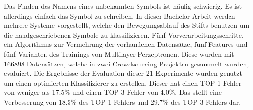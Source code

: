 \documentclass[a4paper,oneside]{scrartcl}
\begin{document}
Das Finden des Namens eines unbekannten Symbols ist häufig schwierig. Es ist
allerdings einfach das Symbol zu schreiben. In dieser Bachelor-Arbeit werden
mehrere Systeme vorgestellt, welche den Bewegungsablauf des Stifts benutzen um
die handgeschriebenen Symbole zu klassifizieren. Fünf Vorverarbeitungsschritte,
ein Algorithmus zur Vermehrung der vorhandenen Datensätze, fünf Features und
fünf Varianten des Trainings von Multilayer-Perzeptronen. Diese wurden mit
166898 Datensätzen, welche in zwei Crowdsourcing-Projekten gesammelt wurden,
evaluiert. Die Ergebnisse der Evaluation dieser 21 Experimente wurden genutzt
um einen optimierten Klassifizierer zu erstellen. Dieser hat einen TOP 1
Fehler von weniger als 17.5\% und einen TOP 3 Fehler von 4.0\%. Das stellt eine
Verbesserung von 18.5\% des TOP 1 Fehlers und 29.7\% des TOP 3 Fehlers
dar.
\end{document}
